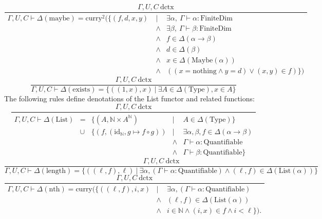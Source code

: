 \documentclass[11pt]{article}
\begin{document}
\begin{equation}
	\frac{\Gamma,U,C\ \text{dctx}}
	{
		\begin{array}{rcl}
			\Gamma,U,C \vdash \Delta(\text{maybe}) =
			\text{curry}^2(\{(f,d,x,y)\
			&|\
			&\exists \alpha,\ \Gamma \vdash \alpha : \text{FiniteDim}
			\\ &\wedge
			& \exists \beta,\ \Gamma \vdash \beta : \text{FiniteDim}
			\\ &\wedge
			& f \in \Delta(\alpha \to \beta)
			\\ &\wedge
			& d \in \Delta(\beta)
			\\ &\wedge
			& x \in \Delta(\text{Maybe}(\alpha))
			\\ & \wedge
			& ((x = \text{nothing} \wedge y = d)
				\vee (x,y) \in f)\})
		\end{array}
	}
\end{equation}
\begin{equation}
	\frac{\Gamma,U,C\ \text{dctx}}
	{\Gamma,U,C \vdash \Delta(\text{exists}) = \{((1,x), x)\ |\ \exists
	A \in \Delta(\text{Type}), x \in A\}}
\end{equation}
The following rules define denotations of the List functor
and related functions:
\begin{equation}
	\frac{\Gamma,U,C\ \text{dctx}}
	{
		\begin{array}{rclcl}
			\Gamma,U,C \vdash \Delta(\text{List})
			&=
			& \{(A, \mathbb{N} \times A^{\mathbb{N}})
			& |
			& A \in \Delta(\text{Type})\}
			\\ & \cup
			& \{(f, (\text{id}_{\mathbb{N}}, g \mapsto f \circ g))
			& |
			& \exists \alpha, \beta, f \in \Delta(\alpha \to \beta)
			\\ &&& \wedge
			& \Gamma \vdash \alpha : \text{Quantifiable}
			\\ &&& \wedge
			& \Gamma \vdash \beta : \text{Quantifiable}\}
		\end{array}
	}
\end{equation}
\begin{equation}
	\frac{\Gamma,U,C\ \text{dctx}}
	{\Gamma,U,C \vdash \Delta(\text{length})
	= \{((\ell,f),\ell)\ |\ \exists \alpha,
	(\Gamma \vdash \alpha : \text{Quantifiable})
	\wedge (\ell,f) \in \Delta(\text{List}(\alpha))\}}
\end{equation}
\begin{equation}
	\frac{\Gamma,U,C\ \text{dctx}}
	{
		\begin{array}{rcl}
			\Gamma,U,C \vdash \Delta(\text{nth})
			= \text{curry}(\{((\ell,f),i,x)
			&|& \exists \alpha,
			(\Gamma \vdash \alpha : \text{Quantifiable})
			\\ &\wedge
			& (\ell,f) \in \Delta(\text{List}(\alpha))
			\\ &\wedge
			& i \in \mathbb{N} \wedge (i,x) \in f \wedge i < \ell\}).
		\end{array}
	}
\end{equation}
\end{document}
